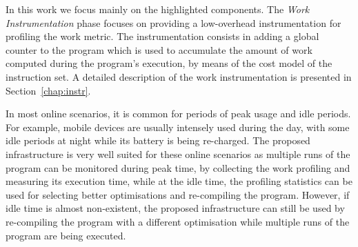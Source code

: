 In this work we focus mainly on the highlighted components.
The \textit{Work Instrumentation} phase focuses on providing a low-overhead instrumentation for profiling the work metric.
The instrumentation consists in adding a global counter to the program which is used to accumulate the amount of work computed during the program's execution, by means of the cost model of the instruction set.
A detailed description of the work instrumentation is presented in Section~\ref{chap:instr}.



In most online scenarios, it is common for periods of peak usage and idle periods.
For example, mobile devices are usually intensely used during the day, with some idle periods at night while its battery is being re-charged.
The proposed infrastructure is very well suited for these online scenarios as multiple runs of the program can be monitored during peak time, by collecting the work profiling and measuring its execution time, while at the idle time, the profiling statistics can be used for selecting better optimisations and re-compiling the program.
However, if idle time is almost non-existent, the proposed infrastructure can still be used by re-compiling the program with a different optimisation while multiple runs of the program are being executed.

